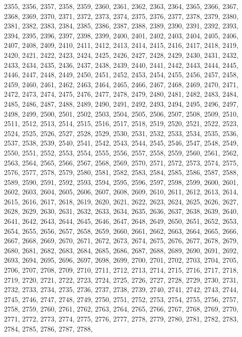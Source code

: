2355,
2356,
2357,
2358,
2359,
2360,
2361,
2362,
2363,
2364,
2365,
2366,
2367,
2368,
2369,
2370,
2371,
2372,
2373,
2374,
2375,
2376,
2377,
2378,
2379,
2380,
2381,
2382,
2383,
2384,
2385,
2386,
2387,
2388,
2389,
2390,
2391,
2392,
2393,
2394,
2395,
2396,
2397,
2398,
2399,
2400,
2401,
2402,
2403,
2404,
2405,
2406,
2407,
2408,
2409,
2410,
2411,
2412,
2413,
2414,
2415,
2416,
2417,
2418,
2419,
2420,
2421,
2422,
2423,
2424,
2425,
2426,
2427,
2428,
2429,
2430,
2431,
2432,
2433,
2434,
2435,
2436,
2437,
2438,
2439,
2440,
2441,
2442,
2443,
2444,
2445,
2446,
2447,
2448,
2449,
2450,
2451,
2452,
2453,
2454,
2455,
2456,
2457,
2458,
2459,
2460,
2461,
2462,
2463,
2464,
2465,
2466,
2467,
2468,
2469,
2470,
2471,
2472,
2473,
2474,
2475,
2476,
2477,
2478,
2479,
2480,
2481,
2482,
2483,
2484,
2485,
2486,
2487,
2488,
2489,
2490,
2491,
2492,
2493,
2494,
2495,
2496,
2497,
2498,
2499,
2500,
2501,
2502,
2503,
2504,
2505,
2506,
2507,
2508,
2509,
2510,
2511,
2512,
2513,
2514,
2515,
2516,
2517,
2518,
2519,
2520,
2521,
2522,
2523,
2524,
2525,
2526,
2527,
2528,
2529,
2530,
2531,
2532,
2533,
2534,
2535,
2536,
2537,
2538,
2539,
2540,
2541,
2542,
2543,
2544,
2545,
2546,
2547,
2548,
2549,
2550,
2551,
2552,
2553,
2554,
2555,
2556,
2557,
2558,
2559,
2560,
2561,
2562,
2563,
2564,
2565,
2566,
2567,
2568,
2569,
2570,
2571,
2572,
2573,
2574,
2575,
2576,
2577,
2578,
2579,
2580,
2581,
2582,
2583,
2584,
2585,
2586,
2587,
2588,
2589,
2590,
2591,
2592,
2593,
2594,
2595,
2596,
2597,
2598,
2599,
2600,
2601,
2602,
2603,
2604,
2605,
2606,
2607,
2608,
2609,
2610,
2611,
2612,
2613,
2614,
2615,
2616,
2617,
2618,
2619,
2620,
2621,
2622,
2623,
2624,
2625,
2626,
2627,
2628,
2629,
2630,
2631,
2632,
2633,
2634,
2635,
2636,
2637,
2638,
2639,
2640,
2641,
2642,
2643,
2644,
2645,
2646,
2647,
2648,
2649,
2650,
2651,
2652,
2653,
2654,
2655,
2656,
2657,
2658,
2659,
2660,
2661,
2662,
2663,
2664,
2665,
2666,
2667,
2668,
2669,
2670,
2671,
2672,
2673,
2674,
2675,
2676,
2677,
2678,
2679,
2680,
2681,
2682,
2683,
2684,
2685,
2686,
2687,
2688,
2689,
2690,
2691,
2692,
2693,
2694,
2695,
2696,
2697,
2698,
2699,
2700,
2701,
2702,
2703,
2704,
2705,
2706,
2707,
2708,
2709,
2710,
2711,
2712,
2713,
2714,
2715,
2716,
2717,
2718,
2719,
2720,
2721,
2722,
2723,
2724,
2725,
2726,
2727,
2728,
2729,
2730,
2731,
2732,
2733,
2734,
2735,
2736,
2737,
2738,
2739,
2740,
2741,
2742,
2743,
2744,
2745,
2746,
2747,
2748,
2749,
2750,
2751,
2752,
2753,
2754,
2755,
2756,
2757,
2758,
2759,
2760,
2761,
2762,
2763,
2764,
2765,
2766,
2767,
2768,
2769,
2770,
2771,
2772,
2773,
2774,
2775,
2776,
2777,
2778,
2779,
2780,
2781,
2782,
2783,
2784,
2785,
2786,
2787,
2788,
